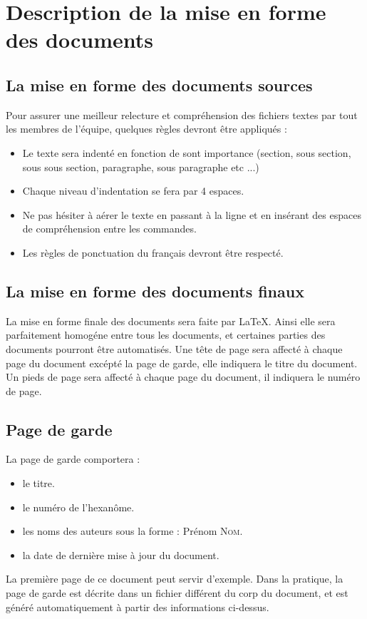 \section{Description de la mise en forme des documents}

\subsection{La mise en forme des documents sources}
    Pour assurer une meilleur relecture et compréhension des fichiers textes par tout les membres de l'équipe, quelques règles devront être appliqués :
    \begin{itemize}
        \item Le texte sera indenté en fonction de sont importance (section, sous section, sous sous section, paragraphe, sous paragraphe etc ...)
        \item Chaque niveau d'indentation se fera par 4 espaces.
        \item Ne pas hésiter à aérer le texte en passant à la ligne et en insérant des espaces de compréhension entre les commandes.
        \item Les règles de ponctuation du français devront être respecté.
    \end{itemize}

\subsection{La mise en forme des documents finaux}
La mise en forme finale des documents sera faite par LaTeX.
Ainsi elle sera parfaitement homogéne entre tous les documents, et certaines parties des documents pourront être automatisés.
Une tête de page sera affecté à chaque page du document excépté la page de garde, elle indiquera le titre du document.
Un pieds de page sera affecté à chaque page du document, il indiquera le numéro de page.

\subsection{Page de garde}

    La page de garde comportera :
    \begin{itemize}
      \item le titre.
      \item le numéro de l'hexanôme.
      \item les noms des auteurs sous la forme : Prénom \textsc{Nom}.
      \item la date de dernière mise à jour du document.
    \end{itemize}
    La première page de ce document peut servir d'exemple.
    Dans la pratique, la page de garde est décrite dans un fichier différent du corp du document, et est généré automatiquement à partir des informations ci-dessus.

